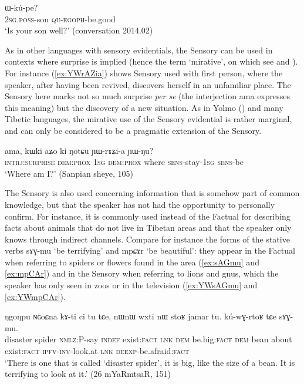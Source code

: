 \documentclass[oldfontcommands,oneside,a4paper,11pt]{article}
\newcommand{\ipa}[1]{{\phon \mbox{#1}}} %
\newcommand{\refb}[1]{(\ref{#1})}
\newcommand{\factual}[1]{\textsc{:fact}}
\begin{document}
\begin{exe}
\ex \label{ex:Wkupe}
\gll \ipa{nɤ-tɕɯ} \ipa{ɯ-kú-pe?}\\
\textsc{2sg.poss}-son \textsc{qu-egoph}-be.good\\
\glt `Is your son well?' (conversation 2014.02)
\end{exe}

 
As in other languages with sensory evidentials, the Sensory can be used in contexts where surprise is implied (hence the term `mirative', on which see \citealt{delancey97mirative} and \citealt{hill12mirativity}). For instance \refb{ex:YWrAZia} shows Sensory used with first person, where the speaker, after having been revived, discovers herself in an unfamiliar place. The Sensory here marks not so much surprise \textit{per se} (the interjection \ipa{ama} expresses this meaning) but the discovery of a new situation. As in Yolmo (\citealt[208]{gawne13copulas}) and many Tibetic languages, the mirative use of the Sensory evidential is rather marginal, and can only be considered to be a pragmatic extension of the Sensory.

\begin{exe}
\ex \label{ex:YWrAZia}
\gll 
\ipa{ama,}  	\ipa{kɯki}  	\ipa{aʑo}  	\ipa{ki}  	\ipa{ŋotɕu}  	\ipa{ɲɯ-rɤʑi-a}  	\ipa{ɲɯ-ŋu?}  \\
\textsc{intrj:surprise} \textsc{dem:prox} \textsc{1sg} \textsc{dem:prox} where \textsc{sens}-stay-\textsc{1sg} \textsc{sens}-be \\
\glt `Where am I?' (Sanpian sheye, 105)
\end{exe}


The Sensory is also used concerning information that is somehow part of common knowledge, but that the speaker has not had the opportunity to personally confirm. For instance, it is commonly used instead of the Factual for describing facts about animals that do not live in Tibetan areas and that the speaker only knows through indirect channels. Compare for instance the forms of the stative verbs \ipa{sɤɣ-mu} `be terrifying' and \ipa{mpɕɤr} `be beautiful': they appear in the Factual when referring to  spiders or flowers found in the area (\ref{ex:sAGmu} and \ref{ex:mpCAr}) and in the Sensory when referring to lions and gnus, which the speaker has only seen in zoos or in the television  (\ref{ex:YWsAGmu} and \ref{ex:YWmpCAr}).
 
 \begin{exe}
\ex \label{ex:sAGmu}
\gll 
\ipa{ŋgoŋpu}  	\ipa{ɴɢoɕna}  	\ipa{kɤ-ti}  	\ipa{ci}  	\ipa{tu}  	\ipa{tɕe,}  	\ipa{nɯnɯ}  	\ipa{wxti}  	\ipa{nɯ}  	\ipa{stoʁ}  	\ipa{jamar}  	\ipa{tu.}  	\ipa{kú-wɣ-rtoʁ}  	\ipa{tɕe}  	\ipa{sɤɣ-mu.}  \\
disaster spider \textsc{nmlz}:P-say \textsc{indef} exist\factual{} \textsc{lnk} \textsc{dem} be.big\factual{}  \textsc{dem} bean about exist\factual{} \textsc{ipfv-inv}-look.at \textsc{lnk} \textsc{deexp}-be.afraid\factual{}  \\
\glt `There is one that is  called `disaster spider', it is big, like the size of a bean. It is terrifying to look at it.' (26 mYaRmtsaR, 151)
\end{exe}
\end{document}
